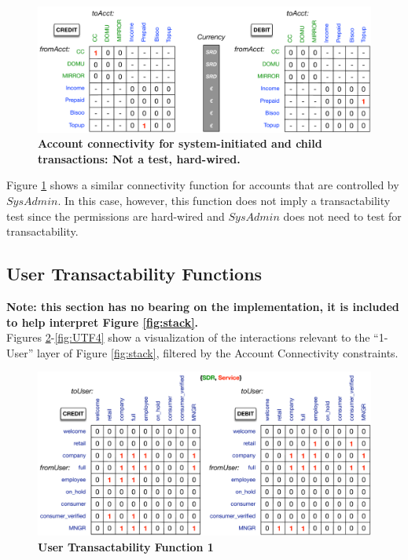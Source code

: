 \begin{figure}[H]
\vspace{-0.5cm}
\centering
\includegraphics[width=15cm]{Figures/SysAdmin_Acct_Connectivity}
\caption{\small\textbf{Account connectivity for system-initiated and child transactions: Not a test, hard-wired. }}
\label{fig:SysAdmin_Acct_Connectivity}
\vspace{-1cm}
\end{figure}

Figure \ref{fig:SysAdmin_Acct_Connectivity} shows a similar connectivity function for accounts that are controlled by $SysAdmin$. In this case, however, this function does not imply a transactability test since the permissions are hard-wired and $SysAdmin$ does not need to test for transactability.

\subsection{User Transactability Functions}
\textbf{\small Note: this section has no bearing on the implementation, it is included to help interpret Figure \ref{fig:stack}.}\\ Figures \ref{fig:UTF1}-\ref{fig:UTF4} show a visualization of the interactions relevant to the ``1-User'' layer of Figure \ref{fig:stack}, filtered by the Account Connectivity constraints.

\begin{figure}[H]
\vspace{-0.5cm}
\centering
\includegraphics[width=16cm]{Figures/UTF1}
\caption{\small\textbf{User Transactability Function 1}}
\label{fig:UTF1}
\end{figure}

